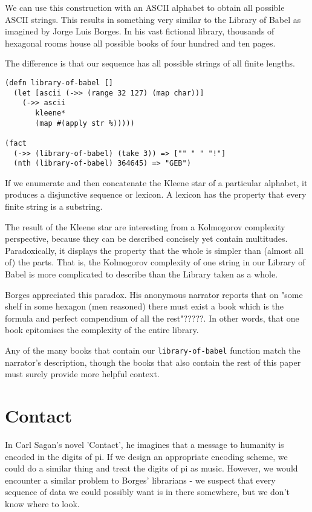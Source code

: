 \documentclass[numbers]{sigplanconf}
\begin{document}
We can use this construction with an ASCII alphabet to obtain all possible ASCII strings.
This results in something very similar to the Library of Babel as imagined by Jorge Luis Borges. In his
vast fictional library, thousands of hexagonal rooms house all possible books of four hundred and ten pages.

The difference is that our sequence has all possible strings of all finite lengths.

\begin{verbatim}
(defn library-of-babel []
  (let [ascii (->> (range 32 127) (map char))]
    (->> ascii
       kleene*
       (map #(apply str %)))))

(fact
  (->> (library-of-babel) (take 3)) => ["" " " "!"]
  (nth (library-of-babel) 364645) => "GEB")
\end{verbatim}

If we enumerate and then concatenate the Kleene star of a particular alphabet, it produces
a disjunctive sequence or lexicon. A lexicon has the property that every finite string is a substring.

The result of the Kleene star are interesting from a Kolmogorov complexity perspective, because they can be described
concisely yet contain multitudes. Paradoxically, it displays the property that the whole is simpler than (almost all of)
the parts. That is, the Kolmogorov complexity of one string in our Library of Babel is more complicated to describe
than the Library taken as a whole.

Borges appreciated this paradox. His anonymous narrator reports that on "some shelf in some hexagon (men reasoned)
there must exist a book which is the formula and perfect compendium of all the rest"?????. In other words, that one book
epitomises the complexity of the entire library.

Any of the many books that contain our \verb|library-of-babel| function match the narrator's description,
though the books that also contain the rest of this paper must surely provide more helpful context.

\section{Contact}

In Carl Sagan's novel 'Contact', he imagines that a message to humanity is encoded in the digits of pi. If we design an
appropriate encoding scheme, we could do a similar thing and treat the digits of pi as music. However, we would encounter
a similar problem to Borges' librarians - we suspect that every sequence of data we could possibly want is in there
somewhere, but we don't know where to look.
\end{document}
